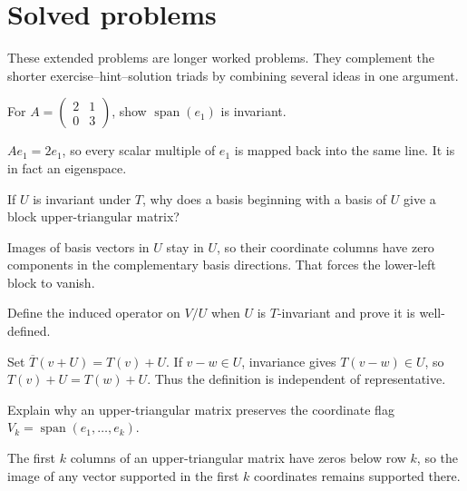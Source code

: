 \section{Solved problems}
These extended problems are longer worked problems. They complement the shorter exercise--hint--solution triads by combining several ideas in one argument.

\begin{problem}\label{prob:i10-problem-01}
For $A=\begin{pmatrix}2&1\\0&3\end{pmatrix}$, show $\operatorname{span}(e_1)$ is invariant.
\end{problem}
\begin{solution}
$Ae_1=2e_1$, so every scalar multiple of $e_1$ is mapped back into the same line. It is in fact an eigenspace.
\end{solution}

\begin{problem}\label{prob:i10-problem-02}
If $U$ is invariant under $T$, why does a basis beginning with a basis of $U$ give a block upper-triangular matrix?
\end{problem}
\begin{solution}
Images of basis vectors in $U$ stay in $U$, so their coordinate columns have zero components in the complementary basis directions. That forces the lower-left block to vanish.
\end{solution}

\begin{problem}\label{prob:i10-problem-03}
Define the induced operator on $V/U$ when $U$ is $T$-invariant and prove it is well-defined.
\end{problem}
\begin{solution}
Set $\overline T(v+U)=T(v)+U$. If $v-w\in U$, invariance gives $T(v-w)\in U$, so $T(v)+U=T(w)+U$. Thus the definition is independent of representative.
\end{solution}

\begin{problem}\label{prob:i10-problem-04}
Explain why an upper-triangular matrix preserves the coordinate flag $V_k=\operatorname{span}(e_1,\dots,e_k)$.
\end{problem}
\begin{solution}
The first $k$ columns of an upper-triangular matrix have zeros below row $k$, so the image of any vector supported in the first $k$ coordinates remains supported there.
\end{solution}

